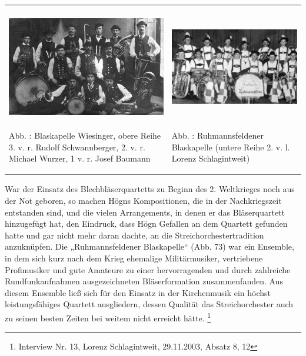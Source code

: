 \begin{flushleft}
\tablefirsthead{}
\tablehead{}
\tabletail{}
\tablelasttail{}
\begin{supertabular}{m{7.573cm}m{8.08cm}}

\includegraphics[width=7.391cm,height=4.703cm]{pictures/zulassungsarbeit-img073.jpg}

\label{bkm:Ref100229810}Abb. : Blaskapelle
Wiesinger, obere Reihe 3. v. r. Rudolf Schwannberger, 2. v. r. Michael
Wurzer, 1 v. r. Josef Baumann &

\includegraphics[width=7.897cm,height=4.706cm]{pictures/zulassungsarbeit-img074.jpg}

\label{bkm:Ref100229831}Abb. :
Ruhmannsfeldener Blaskapelle (untere Reihe 2. v. l. Lorenz
Schlagintweit)\\
\end{supertabular}
\end{flushleft}
War der Einsatz des Blechbläserquartetts zu Beginn des 2. Weltkrieges
noch aus der Not geboren, so machen Högns Kompositionen, die in der
Nachkriegszeit entstanden sind, und die vielen Arrangements, in denen
er das Bläserquartett hinzugefügt hat, den Eindruck, dass Högn Gefallen
an dem Quartett gefunden hatte und gar nicht mehr daran dachte, an die
Streichorchestertradition anzuknüpfen. Die „Ruhmannsfeldener
Blaskapelle“ (Abb. 73) war ein Ensemble, in dem sich kurz nach dem
Krieg ehemalige Militärmusiker, vertriebene Profimusiker und gute
Amateure zu einer hervorragenden und durch zahlreiche Rundfunkaufnahmen
ausgezeichneten Bläserformation zusammenfanden. Aus diesem Ensemble
ließ sich für den Einsatz in der Kirchenmusik ein höchst
leistungsfähiges Quartett ausgliedern, dessen Qualität das
Streichorchester auch zu seinen besten Zeiten bei weitem nicht erreicht
hätte. \footnote{Interview Nr. 13, Lorenz Schlagintweit, 29.11.2003,
Absatz 8, 12}

